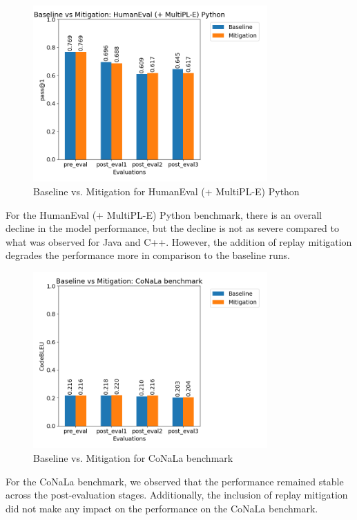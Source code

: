 \begin{figure}[H]
    \centering
    \includegraphics[width=0.8\textwidth]{Figures/results/code_comparisons/human_eval/comparison_humaneval_python.png} 
    \caption{Baseline vs. Mitigation for HumanEval (+ MultiPL-E) Python}
    \label{fig:PythonComparison}
\end{figure}
For the HumanEval (+ MultiPL-E) Python benchmark, there is an overall decline in the model performance, but the decline is not as severe compared to what was observed for Java and C++. However, the addition of replay mitigation degrades the performance more in comparison to the baseline runs.

\begin{figure}[H]
    \centering
    \includegraphics[width=0.8\textwidth]{Figures/results/code_comparisons/conala/comparison_conala.png} 
    \caption{Baseline vs. Mitigation for CoNaLa benchmark}
    \label{fig:ConalaComparison}
\end{figure}
For the CoNaLa benchmark, we observed that the performance remained stable across the post-evaluation stages. Additionally, the inclusion of replay mitigation did not make any impact on the performance on the CoNaLa benchmark.

